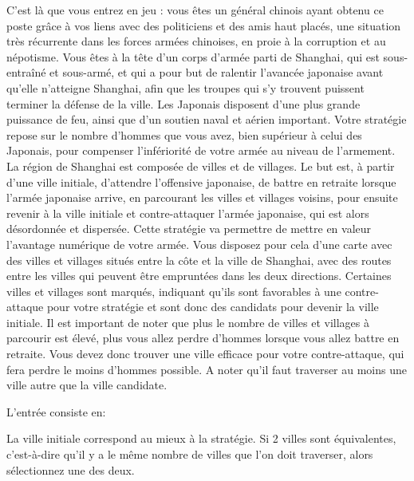 C’est là que vous entrez en jeu : vous êtes un général chinois ayant obtenu ce poste grâce à vos liens avec des politiciens et des amis haut placés, une situation très récurrente dans les forces armées chinoises, en proie à la corruption et au népotisme.
Vous êtes à la tête d’un corps d’armée parti de Shanghai, qui est sous-entraîné et sous-armé, et qui a pour but de ralentir l’avancée japonaise avant qu’elle n’atteigne Shanghai, afin que les troupes qui s’y trouvent puissent terminer la défense de la ville.
Les Japonais disposent d’une plus grande puissance de feu, ainsi que d’un soutien naval et aérien important.
Votre stratégie repose sur le nombre d’hommes que vous avez, bien supérieur à celui des Japonais, pour compenser l’infériorité de votre armée au niveau de l’armement.
La région de Shanghai est composée de villes et de villages. Le but est, à partir d’une ville initiale, d’attendre l’offensive japonaise, de battre en retraite lorsque l’armée japonaise arrive, en parcourant les villes et villages voisins, pour ensuite revenir à la ville initiale et contre-attaquer l’armée japonaise, qui est alors désordonnée et dispersée. Cette stratégie va permettre de mettre en valeur l’avantage numérique de votre armée. Vous disposez pour cela d’une carte avec des villes et villages situés entre la côte et la ville de Shanghai, avec des routes entre les villes qui peuvent être empruntées dans les deux directions. Certaines villes et villages sont marqués, indiquant qu’ils sont favorables à une contre-attaque pour votre stratégie et sont donc des candidats pour devenir la ville initiale. Il est important de noter que plus le nombre de villes et villages à parcourir est élevé, plus vous allez perdre d’hommes lorsque vous allez battre en retraite. Vous devez donc trouver une ville efficace pour votre contre-attaque, qui fera perdre le moins d’hommes possible. A noter qu'il faut traverser au moins une ville autre que la ville candidate.

\begin{Input}
    L'entrée consiste en:
\end{Input}

\begin{Output}
    La ville initiale correspond au mieux à la stratégie. Si 2 villes sont équivalentes, c'est-à-dire qu'il y a le même nombre de villes que l'on doit traverser, alors sélectionnez une des deux.
\end{Output}
